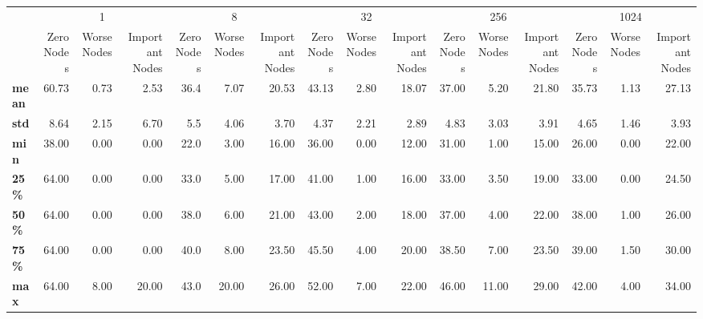 \begin{tabular}{lrrrrrrrrrrrrrrr}
\toprule
{} & \multicolumn{3}{c}{1} & \multicolumn{3}{c}{8} & \multicolumn{3}{c}{32} & \multicolumn{3}{c}{256} & \multicolumn{3}{c}{1024} \\
{} & Zero Nodes & Worse Nodes & Important Nodes & Zero Nodes & Worse Nodes & Important Nodes & Zero Nodes & Worse Nodes & Important Nodes & Zero Nodes & Worse Nodes & Important Nodes & Zero Nodes & Worse Nodes & Important Nodes \\
\midrule
\textbf{mean} &      60.73 &        0.73 &            2.53 &       36.4 &        7.07 &           20.53 &      43.13 &        2.80 &           18.07 &      37.00 &        5.20 &           21.80 &      35.73 &        1.13 &           27.13 \\
\textbf{std } &       8.64 &        2.15 &            6.70 &        5.5 &        4.06 &            3.70 &       4.37 &        2.21 &            2.89 &       4.83 &        3.03 &            3.91 &       4.65 &        1.46 &            3.93 \\
\textbf{min } &      38.00 &        0.00 &            0.00 &       22.0 &        3.00 &           16.00 &      36.00 &        0.00 &           12.00 &      31.00 &        1.00 &           15.00 &      26.00 &        0.00 &           22.00 \\
\textbf{25\% } &      64.00 &        0.00 &            0.00 &       33.0 &        5.00 &           17.00 &      41.00 &        1.00 &           16.00 &      33.00 &        3.50 &           19.00 &      33.00 &        0.00 &           24.50 \\
\textbf{50\% } &      64.00 &        0.00 &            0.00 &       38.0 &        6.00 &           21.00 &      43.00 &        2.00 &           18.00 &      37.00 &        4.00 &           22.00 &      38.00 &        1.00 &           26.00 \\
\textbf{75\% } &      64.00 &        0.00 &            0.00 &       40.0 &        8.00 &           23.50 &      45.50 &        4.00 &           20.00 &      38.50 &        7.00 &           23.50 &      39.00 &        1.50 &           30.00 \\
\textbf{max } &      64.00 &        8.00 &           20.00 &       43.0 &       20.00 &           26.00 &      52.00 &        7.00 &           22.00 &      46.00 &       11.00 &           29.00 &      42.00 &        4.00 &           34.00 \\
\bottomrule
\end{tabular}
